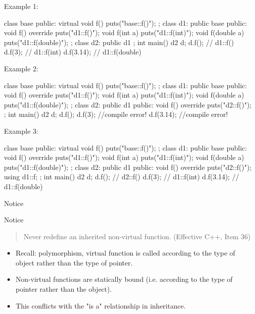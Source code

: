 \documentclass{beamer}
\begin{document}
\begin{frame}[fragile]{Example 1:}
\begin{cpp}
class base{ public:
    virtual void f() {puts("base::f()");}
};
class d1: public base{ public:
    void f() override {puts("d1::f()");}
    void f(int a) {puts("d1::f(int)");}
    void f(double a) {puts("d1::f(double)");}
};
class d2: public d1{
};
int main(){
    d2 d;
    d.f(); // d1::f()
    d.f(3); // d1::f(int)
    d.f(3.14); // d1::f(double)
}
\end{cpp}
\end{frame}

\begin{frame}[fragile]{Example 2:}%
\begin{cpp}
class base{ public:
    virtual void f() {puts("base::f()");}
};
class d1: public base{ public:
    void f() override {puts("d1::f()");}
    void f(int a) {puts("d1::f(int)");}
    void f(double a) {puts("d1::f(double)");}
};
class d2: public d1{ public:
    void f() override {puts("d2::f()");}
};
int main(){
    d2 d;
    d.f(); 
    d.f(3); //compile error!
    d.f(3.14); //compile error!
}
\end{cpp}
\end{frame}

\begin{frame}[fragile]{Example 3:}
\begin{cpp}
class base{ public:
    virtual void f() {puts("base::f()");}
};
class d1: public base{ public:
    void f() override {puts("d1::f()");}
    void f(int a) {puts("d1::f(int)");}
    void f(double a) {puts("d1::f(double)");}
};
class d2: public d1{ public:
    void f() override {puts("d2::f()");}
    using d1::f;
};
int main(){
    d2 d;
    d.f(); // d2::f()
    d.f(3); // d1::f(int)
    d.f(3.14); // d1::f(double)
}
\end{cpp}
\end{frame}

\begin{frame}{Notice}
    \begin{alertblock}{Notice}
        \begin{quote}
            Never redefine an inherited non-virtual function. (Effective C++, Item 36)
        \end{quote}
    \end{alertblock}
    \begin{itemize}
        \item Recall: polymorphism, virtual function is called according to the type of object rather than the type of pointer.
        \item Non-virtual functions are statically bound (i.e. according to the type of pointer rather than the object).
        \item This conflicts with the "is a" relationship in inheritance.
    \end{itemize}
\end{frame}
\end{document}
